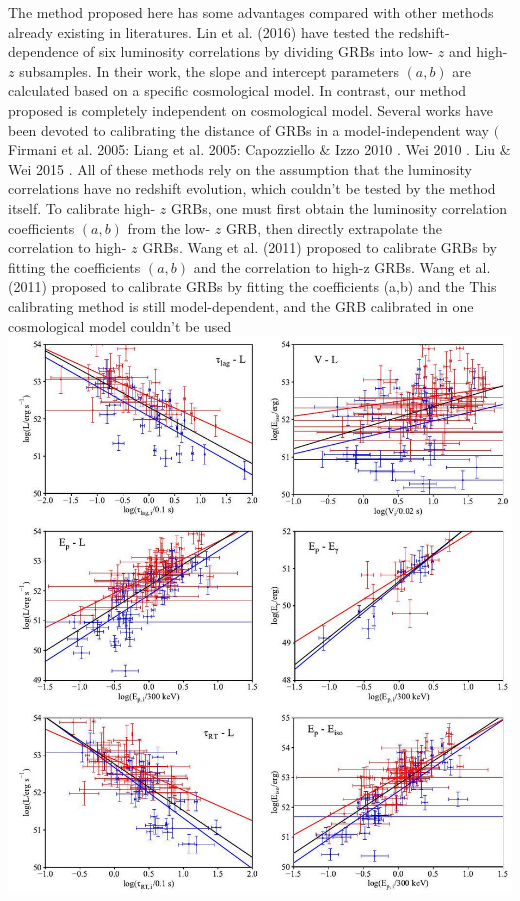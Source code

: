 \documentclass[10pt, a4paper]{article}
\begin{document}
The method proposed here has some advantages compared with other methods already existing in literatures. Lin et al. (2016) have tested the redshift-dependence of six luminosity correlations by dividing GRBs into low- $z$ and high- $z$ subsamples. In their work, the slope and intercept parameters $(a, b)$ are calculated based on a specific cosmological model. In contrast, our method proposed is completely independent on cosmological model. Several works have been devoted to calibrating the distance of GRBs in a model-independent way $($ Firmani et al. 2005: Liang et al. 2005: Capozziello \& Izzo 2010 . Wei 2010 . Liu \& Wei 2015 . All of these methods rely on the assumption that the luminosity correlations have no redshift evolution, which couldn't be tested by the method itself. To calibrate high- $z$ GRBs, one must first obtain the luminosity correlation coefficients $(a, b)$ from the low- $z$ GRB, then directly extrapolate the correlation to high- $z$ GRBs. Wang et al. (2011) proposed to calibrate GRBs by fitting the coefficients $(a, b)$ and the correlation to high-z GRBs. Wang et al. (2011) proposed to calibrate GRBs by fitting the coefficients (a,b) and the This calibrating method is still model-dependent, and the GRB calibrated in one cosmological model couldn't be used\\

\includegraphics[max width=\textwidth]{2022_04_27_cf6124939ea404970a21g-09}
\end{document}
